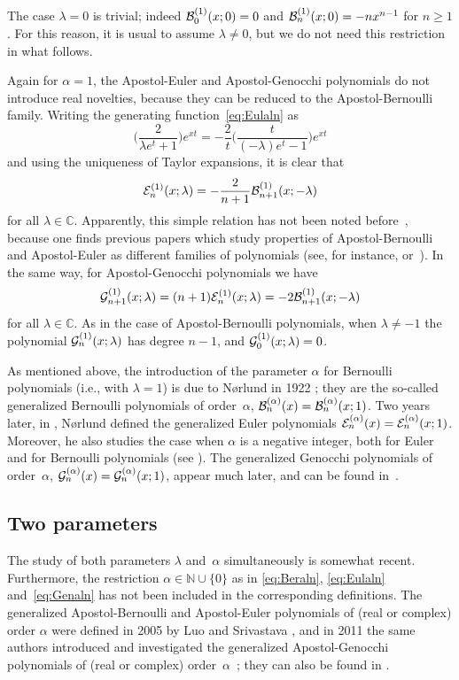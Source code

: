 \documentclass[11pt,a4paper]{amsart}
\newcommand{\N}{\mathbb{N}}
\newcommand{\C}{\mathbb{C}}
\newcommand{\B}[1][]{\mathcal{B}\ifx#1\empty\else^{(#1)}\fi}
\newcommand{\E}[1][]{\mathcal{E}\ifx#1\empty\else^{(#1)}\fi}
\newcommand{\G}[1][]{\mathcal{G}\ifx#1\empty\else^{(#1)}\fi}
\theoremstyle{plain}
\theoremstyle{plain}
\theoremstyle{plain}
\begin{document}
The case $\lambda = 0$ is trivial; indeed $\B[1]_{0}(x;0) = 0$ and $\B[1]_{n}(x;0) = -nx^{n-1}$ for $n \ge 1$. 
For this reason, it is usual to assume $\lambda \neq 0$, but we do not need this restriction in what follows.

Again for $\alpha=1$, the Apostol-Euler and Apostol-Genocchi polynomials do not introduce real novelties, because they can be reduced to the Apostol-Bernoulli family. Writing the generating function~\eqref{eq:Eulaln} as
\[
  \Big( \frac{2}{\lambda e^t+1} \Big) e^{xt}
  = -\frac{2}{t} \Big( \frac{t}{(-\lambda) e^t-1} \Big) e^{xt} 
\]
and using the uniqueness of Taylor expansions, it is clear that
\[
  \E[1]_{n}(x;\lambda) = - \frac{2}{n+1} \B[1]_{n+1}(x;-\lambda)
\] 
for all $\lambda \in \C$. Apparently, this simple relation has not been noted before~\cite{NRV-MC}, because one finds previous papers which study properties of Apostol-Bernoulli and Apostol-Euler as different families of polynomials (see, for instance, \cite{Luo-MC} or~\cite{Bayad}). In the same way, for Apostol-Genocchi polynomials we have
\[
  \G[1]_{n+1}(x;\lambda) = (n+1) \E[1]_{n}(x;\lambda) = -2 \B[1]_{n+1}(x;-\lambda)
\] 
for all $\lambda \in \C$. 
As in the case of Apostol-Bernoulli polynomials, when $\lambda \ne -1$ the polynomial $\G[1]_{n}(x;\lambda)$ has degree $n-1$, and  $\G[1]_{0}(x;\lambda) = 0$.

As mentioned above, the introduction of the parameter $\alpha$ for Bernoulli polynomials (i.e., with $\lambda=1$) is due to N{\o}rlund in 1922 \cite{Nor}; they are the so-called generalized Bernoulli polynomials of order~$\alpha$, $\B[\alpha]_n(x) = \B[\alpha]_n(x;1)$. Two years later, in \cite[p.~120]{Nor-book}, N{\o}rlund defined the generalized Euler polynomials $\E[\alpha]_n(x) = \E[\alpha]_n(x;1)$. Moreover, he also studies the case when $\alpha$ is a negative integer, both for Euler and for Bernoulli polynomials (see \cite[p.~130]{Nor-book}). The generalized Genocchi polynomials of order~$\alpha$, $\G[\alpha]_n(x) = \G[\alpha]_n(x;1)$, appear much later, and can be found in~\cite{Hor}.

\subsection{Two parameters}
\label{sec:twopar}

The study of both parameters $\lambda$ and~$\alpha$ simultaneously is somewhat recent. Furthermore, the restriction $\alpha \in \N \cup \{0\}$ as in \eqref{eq:Beraln}, \eqref{eq:Eulaln} and~\eqref{eq:Genaln} has not been included in the corresponding definitions. 
The generalized Apostol-Bernoulli and Apostol-Euler polynomials of (real or complex) order $\alpha$ were defined in 2005 by Luo and Srivastava \cite{LuoSri-BeEu}, and in 2011 the same authors introduced and investigated the generalized Apostol-Genocchi polynomials of (real or complex) order~$\alpha$~\cite{LuoSri-Ge}; they can also be found in \cite[\S 1.9, p.~91]{SriCh}. 
\end{document}
